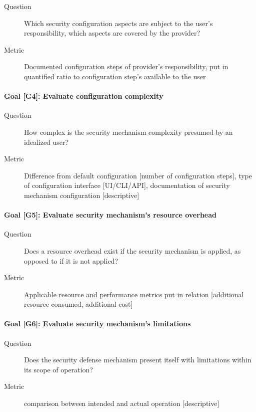 {		\begin{description}
			\item[Question] Which security configuration aspects are subject to the user's responsibility, which aspects are covered by the provider?
			\item[Metric] Documented configuration steps of provider's responsibility, put in quantified ratio to configuration step's available to the user \\
		\end{description}
		
		
		\paragraph{Goal [G4]: \textbf{Evaluate configuration complexity}\label{g4}}
		
		\begin{description}
			\item[Question] How complex is the security mechanism complexity presumed by an idealized user? 
			\item[Metric] Difference from default configuration [number of configuration steps], type of configuration interface [UI/CLI/API], documentation of security mechanism configuration [descriptive] \\
		\end{description}
		
		
		\paragraph{Goal [G5]: \textbf{Evaluate security mechanism's resource overhead}\label{g5}}
		
		\begin{description}
			\item[Question] Does a resource overhead exist if the security mechanism is applied, as opposed to if it is not applied? 
			\item[Metric] Applicable resource and performance metrics put in relation [additional resource consumed, additional cost] \\
		\end{description}
		
		
		\paragraph{Goal [G6]: \textbf{Evaluate security mechanism's limitations}\label{g6}}
		
		\begin{description}
			\item[Question] Does the security defense mechanism present itself with limitations within its scope of operation?
			\item[Metric] comparison between intended and actual operation [descriptive] \\
		\end{description}
		
}
